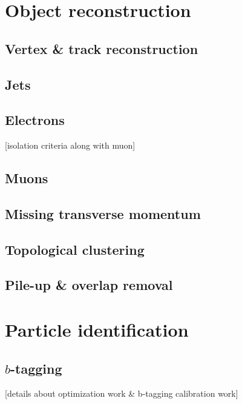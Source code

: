 \documentclass[../thesis.tex]{subfiles}
\begin{document}
\vspace{-1\baselineskip}

\section{Object reconstruction}
\label{sec:reco}

\subsection{Vertex \& track reconstruction}
\subsection{Jets}
\subsection{Electrons}
[isolation criteria along with muon]
\subsection{Muons}
\subsection{Missing transverse momentum}
\subsection{Topological clustering}
\subsection{Pile-up \& overlap removal}


\section{Particle identification}
\label{sec:pid}
\subsection*{$b$-tagging}
[details about optimization work \& b-tagging calibration work]
\end{document}
